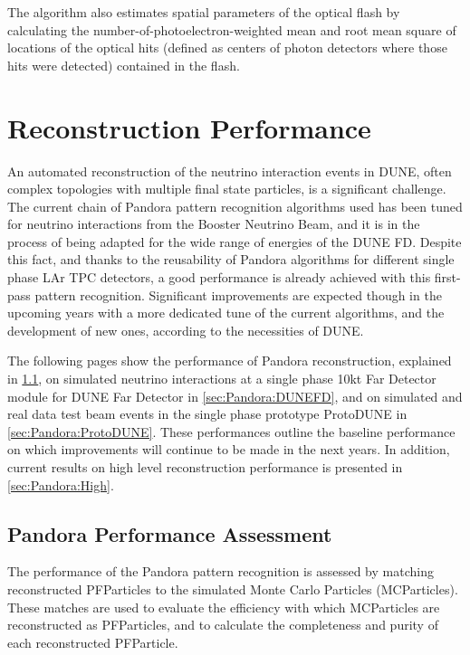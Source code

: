 The algorithm also estimates spatial parameters of the optical flash
by calculating the number-of-photoelectron-weighted mean and 
root mean square of locations of the optical hits
(defined as centers of photon detectors where those hits were detected)
contained in the flash.

\section{Reconstruction Performance}

An automated reconstruction of the neutrino interaction events in DUNE, often complex topologies with multiple final state particles, is a significant challenge. The current chain of Pandora pattern recognition algorithms used has been tuned for neutrino interactions from the Booster Neutrino Beam, and it is in the process of being adapted for the wide range of energies of the DUNE FD. Despite this fact, and thanks to the reusability of Pandora algorithms for different single phase LAr TPC detectors, a good performance is already achieved with this first-pass pattern recognition. Significant improvements are expected though in the upcoming years with a more dedicated tune of the current algorithms, and the development of new ones, according to the necessities of DUNE. 

The following pages show the performance of Pandora reconstruction, explained in \ref{sec:Pandora:assessment}, on simulated neutrino interactions at a single phase 10kt Far Detector module for DUNE Far Detector in \ref{sec:Pandora:DUNEFD}, and on simulated and real data test beam events in the single phase prototype ProtoDUNE in \ref{sec:Pandora:ProtoDUNE}. These performances outline the baseline performance on which improvements will continue to be made in the next years. In addition, current results on high level reconstruction performance is presented in  \ref{sec:Pandora:High}.

\subsection{Pandora Performance Assessment}
\label{sec:Pandora:assessment}
The performance of the Pandora pattern recognition is assessed by matching reconstructed PFParticles to the simulated Monte Carlo Particles (MCParticles). These matches are used to evaluate the efficiency with which MCParticles are reconstructed as PFParticles, and to calculate the completeness and purity of each reconstructed PFParticle. 

